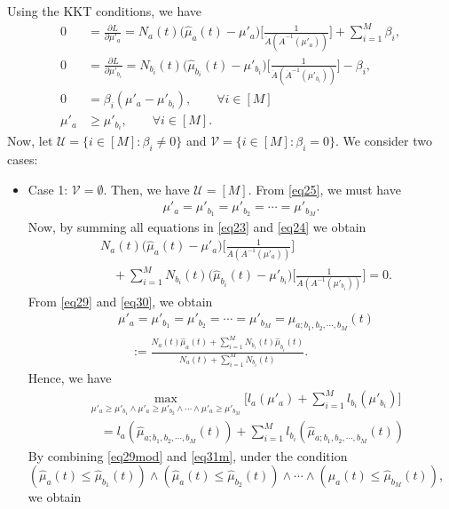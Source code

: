 \documentclass[final]{IEEEtran}
\newcommand{\nn}{\nonumber}
\newcommand{\calU}{\mathcal{U}}
\newcommand{\calV}{\mathcal{V}}
\begin{document}
Using the KKT conditions, we have
\begin{align}
0&=\frac{\partial L}{\partial \mu'_a}= N_a(t)\big(\hat{\mu}_a(t)-\mu'_a\big)\bigg[\frac{1}{\ddot{A}(\dot{A}^{-1}(\mu'_a))}\bigg]+\sum_{i=1}^M \beta_i \label{eq23},\\
0&=\frac{\partial L}{\partial \mu'_{b_i}}= N_{b_i}(t)\big(\hat{\mu}_{b_i}(t)-\mu'_{b_i}\big)\bigg[\frac{1}{\ddot{A}(\dot{A}^{-1}(\mu'_{b_i}))}\bigg]-\beta_i  \label{eq24},\\
0&=\beta_i(\mu'_a-\mu'_{b_i}), \qquad \forall i \in [M] \label{eq25}\\
\mu'_a&\geq \mu'_{b_i}, \qquad \forall i \in [M] \label{eq26}.
\end{align}
Now, let $\calU=\{i \in [M]: \beta_i\neq 0\}$ and $\calV=\{i \in [M]: \beta_i =0\}$. We consider two cases:
\begin{itemize}
\item Case 1: $\calV =\emptyset$. Then, we have $\calU=[M]$. 
From \eqref{eq25}, we must have
\begin{align}
\mu'_a=\mu'_{b_1}=\mu'_{b_2}=\cdots= \mu'_{b_M} \label{eq29}.
\end{align}
Now, by summing all equations in \eqref{eq23} and \eqref{eq24} we obtain
\begin{align}
 &N_a(t)\big(\hat{\mu}_a(t)-\mu'_a\big)\bigg[\frac{1}{\ddot{A}(A^{-1}(\mu'_a))}\bigg]\nn\\
 &\quad + \sum_{i=1}^M N_{b_i}(t)\big(\hat{\mu}_{b_i}(t)-\mu'_{b_i}\big)\bigg[\frac{1}{\ddot{A}(A^{-1}(\mu'_{b_i}))}\bigg]=0 \label{eq30}. 
\end{align}
From \eqref{eq29} and \eqref{eq30}, we obtain
\begin{align}
&\mu'_a=\mu'_{b_1}=\mu'_{b_2}=\cdots= \mu'_{b_M}=\hat{\mu}_{a;b_1,b_2,\cdots, b_M}(t)\nn\\
&\quad :=\frac{N_a(t) \hat{\mu}_a(t)+\sum_{i=1}^M N_{b_i}(t)\hat{\mu}_{b_i}(t)}{N_a(t)+\sum_{i=1}^M N_{b_i}(t)}.
\end{align}
Hence, we have
\begin{align}
&\max_{\mu'_a\geq \mu'_{b_1} \wedge \mu'_a \geq \mu'_{b_2} \wedge \cdots \wedge \mu'_a \geq \mu'_{b_M} }\bigg[l_a(\mu'_a)+\sum_{i=1}^M l_{b_i}(\mu'_{b_i})\bigg]\nn\\
&\quad =l_a(\hat{\mu}_{a;b_1,b_2,\cdots, b_M}(t))+\sum_{i=1}^M l_{b_i} (\hat{\mu}_{a;b_1,b_2,\cdots, b_M}(t)) \label{eq31m}
\end{align}
By combining \eqref{eq29mod} and \eqref{eq31m}, under the condition $(\hat{\mu}_a(t)\leq \hat{\mu}_{b_1}(t))\wedge (\hat{\mu}_a(t)\leq \hat{\mu}_{b_2}(t))\wedge \cdots \wedge (\hat{\mu}_a(t)\leq \hat{\mu}_{b_M}(t))$, we obtain

\end{itemize}
\end{document}
